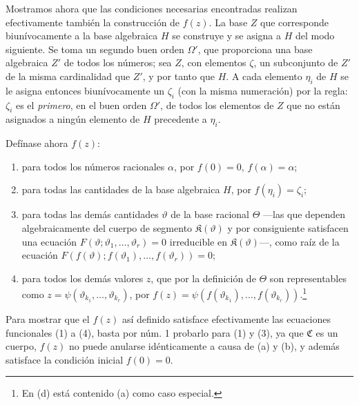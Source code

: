 \documentclass[11pt]{article}
\begin{document}
Mostramos ahora que las condiciones necesarias encontradas realizan efectivamente también la construcción de $f(z)$. La base $Z$ que corresponde biunívocamente a la base algebraica $H$ se construye y se asigna a $H$ del modo siguiente. Se toma un segundo buen orden $\Omega'$, que proporciona una base algebraica $Z'$ de todos los números; sea $Z$, con elementos $\zeta$, un subconjunto de $Z'$ de la misma cardinalidad que $Z'$, y por tanto que $H$. A cada elemento $\eta_i$ de $H$ se le asigna entonces biunívocamente un $\zeta_i$ (con la misma numeración) por la regla: $\zeta_i$ es el \emph{primero}, en el buen orden $\Omega'$, de todos los elementos de $Z$ que no están asignados a ningún elemento de $H$ precedente a $\eta_i$.

Defínase ahora $f(z)$:
\begin{enumerate}
\item[a)] para todos los números racionales $\alpha$, por $f(0)=0$, $f(\alpha)=\alpha$;
\item[b)] para todas las cantidades de la base algebraica $H$, por $f(\eta_i)=\zeta_i$;
\item[c)] para todas las demás cantidades $\vartheta$ de la base racional $\Theta$ ---las que dependen algebraicamente del cuerpo de segmento $\mathfrak K(\vartheta)$ y por consiguiente satisfacen una ecuación $F(\vartheta;\vartheta_1,\ldots,\vartheta_r)=0$ irreducible en $\mathfrak K(\vartheta)$---, como raíz de la ecuación $F(f(\vartheta);f(\vartheta_1),\ldots,f(\vartheta_r))=0$;
\item[d)] para todos los demás valores $z$, que por la definición de $\Theta$ son representables como $z=\psi(\vartheta_{k_1},\ldots,\vartheta_{k_r})$, por $f(z)=\psi(f(\vartheta_{k_1}),\ldots,f(\vartheta_{k_r}))$.\footnote{En (d) está contenido (a) como caso especial.}
\end{enumerate}

Para mostrar que el $f(z)$ así definido satisface efectivamente las ecuaciones funcionales (1) a (4), basta por núm. 1 probarlo para (1) y (3), ya que $\mathfrak C$ es un cuerpo, $f(z)$ no puede anularse idénticamente a causa de (a) y (b), y además satisface la condición inicial $f(0)=0$.
\end{document}
